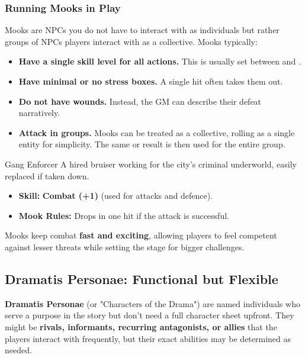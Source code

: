 \subsubsection{Running Mooks in Play}
Mooks are NPCs you do not have to interact with as individuals but rather groups of NPCs players interact with as a collective. Mooks typically:
\begin{itemize}
    \item \textbf{Have a single skill level for all actions.} This is usually set between \Weak and \Skilled.
    \item \textbf{Have minimal or no stress boxes.} A single hit often takes them out.
    \item \textbf{Do not have wounds.} Instead, the GM can describe their defeat narratively.
    \item \textbf{Attack in groups.} Mooks can be treated as a collective, rolling as a single entity for simplicity. The same \Attack or \Defend result is then used for the entire group.
\end{itemize}

\begin{Example}{Gang Enforcer}
	A hired bruiser working for the city’s criminal underworld, easily replaced if taken down.
	\begin{itemize}
    	\item \textbf{Skill:} \textbf{Combat (+1)} (used for attacks and defence).
	    \item \textbf{Mook Rules:} Drops in one hit if the attack is successful.
	\end{itemize}
\end{Example}

Mooks keep combat \textbf{fast and exciting}, allowing players to feel competent against lesser threats while setting the stage for bigger challenges.

\subsection{Dramatis Personae: Functional but Flexible}
\textbf{Dramatis Personae} (or "Characters of the Drama") are named individuals who serve a purpose in the story but don’t need a full character sheet upfront. They might be \textbf{rivals, informants, recurring antagonists, or allies} that the players interact with frequently, but their exact abilities may be determined as needed.

